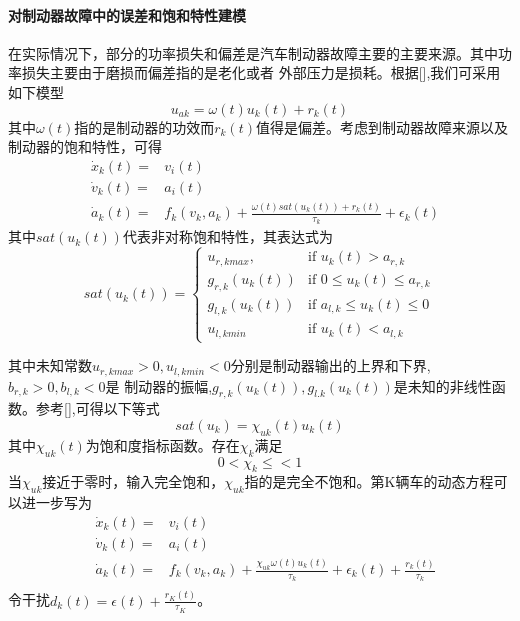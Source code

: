 \documentclass{cjc}
\begin{document}
    \paragraph{对{\color{red}制动器故障}中的误差和饱和特性建模}
    在实际情况下，部分的功率损失和偏差是汽车制动器故障主要的主要来源。其中功率损失主要由于磨损而偏差指的是老化或者
    外部压力是损耗。根据[],我们可采用如下模型\:
    \begin{equation}
      u_{ak} = \omega (t) u_k(t) + r_k(t) 
    \end{equation}
    其中$\omega (t)$指的是制动器的功效而$r_k(t)$值得是偏差。考虑到制动器故障来源以及制动器的饱和特性，可得\:
    \begin{eqnarray}
      &\dot{x}_k(t) =& v_i(t) \nonumber \\
      &\dot{v}_k(t) =& a_i(t) \nonumber \\
      &\dot{a}_k(t) =& f_k(v_k,a_k) \nonumber + \frac{\omega (t) sat(u_k(t)) + r_k(t)}{\tau _k} + \epsilon _k(t)
    \end{eqnarray}
    其中$sat(u_k(t))$代表非对称饱和特性，其表达式为\:
    \begin{equation}
      sat(u_k(t)) = 
      \begin{cases}
        u_{r,kmax}, & \mbox{if } u_k(t) > a_{r,k} \\
        g_{r,k}(u_k(t)) &\mbox{if }  0\leq u_k(t) \leq a_{r,k}\\
        g_{l,k}(u_k(t)) &\mbox{if } a_{l,k} \leq u_k(t) \leq 0\\
        u_{l,kmin} &\mbox{if } u_k(t) < a_{l,k}
      \end{cases}
    \end{equation}

    其中未知常数$u_{r,kmax} > 0 , u_{l,kmin} < 0$分别是制动器输出的上界和下界,$b_{r,k} > 0, b_{l,k}<0$是
    制动器的振幅,$g_{r,k}(u_k(t)),g_{l.k}(u_k(t))$是未知的非线性函数。参考[],可得以下等式\:
    \begin{equation}
      sat(u_k) = \chi _{uk}(t) u_k(t)
    \end{equation}
    其中$\chi _{uk}(t)$为饱和度指标函数。存在$\chi _k$满足\:
    \begin{equation}
      0 < \chi _k \leq < 1
    \end{equation}
    当$\chi _{uk}$接近于零时，输入完全饱和，$\chi _{uk}$指的是完全不饱和。第K辆车的动态方程可以进一步写为\:
    \begin{eqnarray}
      &\dot{x}_k(t) =& v_i(t) \nonumber \\
      &\dot{v}_k(t) =& a_i(t) \nonumber \\
      &\dot{a}_k(t) =& f_k(v_k,a_k) \nonumber + \frac{\chi _{uk}\omega (t) u_k(t) }{\tau _k} + \epsilon _k(t) + \frac{r_k(t)}{\tau _k} \nonumber \\
    \end{eqnarray}
    令干扰$d_k(t) = \epsilon (t) + \frac{r_K(t)}{\tau _K}$。
\end{document}
